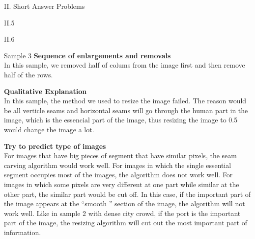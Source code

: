 \documentclass[a4paper,12pt]{article}
\begin{document}
\begin{section}{II. Short Answer Problems}
\begin{subsection}{II.5}
\begin{subsection}{II.6}
\begin{subsubsection}{Sample 3}
\textbf{Sequence of enlargements and removals}\\
In this sample, we removed half of colums from the image first and then remove half of the rows.

\textbf{Qualitative Explanation}\\
In this sample, the method we used to resize the image failed. The reason would be all verticle seams and horizontal seams will go through the human part in the image, which is the essencial part of the image, thus resizing the image to 0.5 would change the image a lot.

\end{subsubsection}

\textbf{Try to predict type of images}\\
For images that have big pieces of segment that have similar pixels, the seam carving algorithm would work well. For images in which the single essential segment occupies most of the images, the algorithm does not work well. For images in which some pixels are very different at one part while similar at the other part, the similar part would be cut off. In this case, if the important part of the image appears at the ``smooth '' section of the image, the algorithm will not work well. Like in sample 2 with dense city crowd, if the port is the important part of the image, the resizing algorithm will cut out the most important part of information.

\end{subsection}

\end{subsection}


\end{section}
\end{document}

